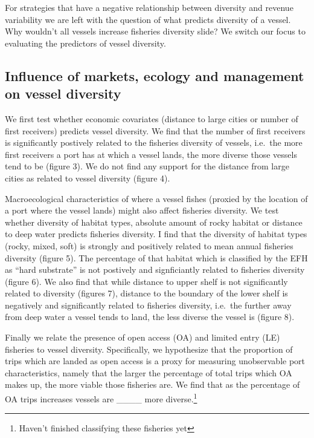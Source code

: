\documentclass[]{article}
\let\rmarkdownfootnote\footnote%
\def\footnote{\protect\rmarkdownfootnote}
\begin{document}
For strategies that have a negative relationship between diversity and
revenue variability we are left with the question of what predicts
diversity of a vessel. Why wouldn't all vessels increase fisheries
diversity slide? We switch our focus to evaluating the predictors of
vessel diversity.

\subsection{Influence of markets, ecology and management on vessel
diversity}\label{influence-of-markets-ecology-and-management-on-vessel-diversity}

We first test whether economic covariates (distance to large cities or
number of first receivers) predicts vessel diversity. We find that the
number of first receivers is significantly postively related to the
fisheries diversity of vessels, i.e.~the more first receivers a port has
at which a vessel lands, the more diverse those vessels tend to be
(figure 3). We do not find any support for the distance from large
cities as related to vessel diversity (figure 4).

Macroecological characteristics of where a vessel fishes (proxied by the
location of a port where the vessel lands) might also affect fisheries
diversity. We test whether diversity of habitat types, absolute amount
of rocky habitat or distance to deep water predicts fisheries diversity.
I find that the diversity of habitat types (rocky, mixed, soft) is
strongly and positively related to mean annual fisheries diversity
(figure 5). The percentage of that habitat which is classified by the
EFH as ``hard substrate'' is not postively and signficiantly related to
fisheries diversity (figure 6). We also find that while distance to
upper shelf is not significantly related to diversity (figures 7),
distance to the boundary of the lower shelf is negatively and
significantly related to fisheries diversity, i.e.~the further away from
deep water a vessel tends to land, the less diverse the vessel is
(figure 8).

Finally we relate the presence of open access (OA) and limited entry
(LE) fisheries to vessel diversity. Specifically, we hypothesize that
the proportion of trips which are landed as open access is a proxy for
measuring unobservable port characteristics, namely that the larger the
percentage of total trips which OA makes up, the more viable those
fisheries are. We find that as the percentage of OA trips increases
vessels are \_\_\_\_ more diverse.\footnote{Haven't finished classifying
  these fisheries yet}
\end{document}
